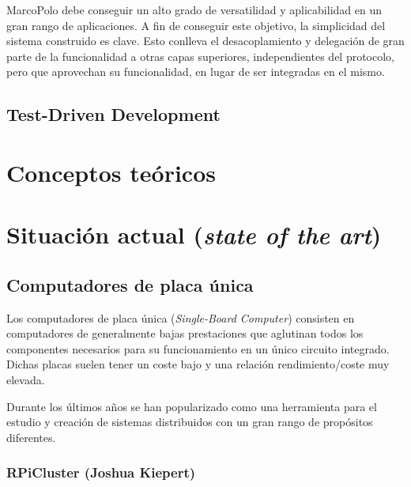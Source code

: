 MarcoPolo debe conseguir un alto grado de versatilidad y aplicabilidad en un gran rango de aplicaciones. A fin de conseguir este objetivo, la simplicidad del sistema construido es clave. Esto conlleva el desacoplamiento y delegación de gran parte de la funcionalidad a otras capas superiores, independientes del protocolo, pero que aprovechan su funcionalidad, en lugar de ser integradas en el mismo.

\subsection{Test-Driven Development}

\section{Conceptos teóricos}

\section{Situación actual (\textit{state of the art})}


\subsection{Computadores de placa única}

Los computadores de placa única (\textit{Single-Board Computer}) consisten en computadores de generalmente bajas prestaciones que aglutinan todos los componentes necesarios para su funcionamiento en un único circuito integrado. Dichas placas suelen tener un coste bajo y una relación rendimiento/coste muy elevada.

Durante los últimos años se han popularizado como una herramienta para el estudio y creación de sistemas distribuidos con un gran rango de propósitos diferentes.

\subsubsection{RPiCluster (Joshua Kiepert)}

